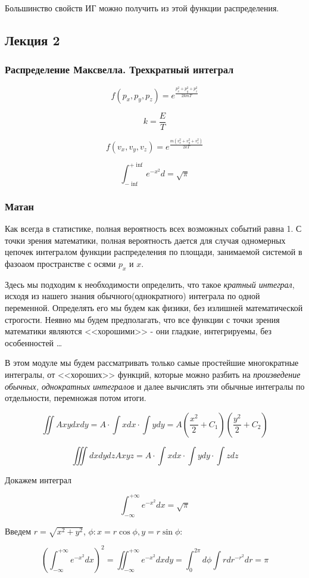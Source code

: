 \documentclass{article}
\begin{document}
Большинство свойств ИГ можно получить из этой функции распределения. 
\subsection{Лекция 2}
\subsubsection{Распределение Максвелла. Трехкратный интеграл}

$$f(p_x, p_y, p_z) = e^{\frac{p_x^2 + p_y^2 + p_z^2}{2kmT}}$$

$$k = \frac ET$$

$$f(v_x, v_y,v_z) = e^{\frac{m(v_x^2+v_y^2 + v_z^2)}{2kT}}$$

$$\int^{+\inf}_{-\inf}e^{-x^2}d = \sqrt{\pi}$$

\subsubsection{Матан}
Как всегда в статистике, полная вероятность всех возможных событий равна 1. С точки зрения математики, полная вероятность дается для случая одномерных цепочек интегралом функции распределения по площади, занимаемой системой в фазоаом пространстве с осями $p_x$ и $x$. 

Здесь мы подходим к необходимости определить, что такое \emph{кратный интеграл}, исходя из нашего знания обычного(однократного) интеграла по одной переменной. Определять его мы будем как физики, без излишней математической строгости. Неявно мы будем предполагать, что все функции с точки зрения математики являются <<хорошими>> - они гладкие, интегрируемы, без особенностей \ldots

В этом модуле мы будем рассматривать только самые простейшие многократные интегралы, от <<хороших>> функций, которые можно разбить на \emph{произведение обычных, однократных интегралов} и далее вычислять эти обычные интегралы по отдельности, перемножая потом итоги.

$$\iint Axydxdy = A \cdot\int xdx \cdot\int ydy = A(\frac{x^2}2 + C_1)(\frac{y^2}2 + C_2)$$

$$\iiint dxdydz A x y z = A \cdot\int xdx \cdot\int ydy \cdot\int zdz $$

Докажем интеграл 

$$\int_{-\infty}^{+\infty} e^{-x^2}dx = \sqrt{\pi} $$

Введем $r = \sqrt{x^2+y^2}$, $\phi: x=r\cos\phi, y=r\sin\phi$:

$$(\int_{-\infty}^{+\infty} e^{-x^2}dx )^2 = \iint _{-\infty}^{+\infty} e^{-x^2}dxdy =  \int_{0}^{2\pi}d\phi \int r dr ^{-r^2}dr = \pi$$
\end{document}
